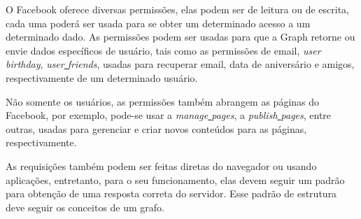 O Facebook oferece diversas permissões, elas podem ser de leitura ou de escrita, cada uma poderá ser usada para se obter um determinado acesso a um determinado dado. As permissões podem ser usadas para que a Graph retorne ou envie dados específicos de usuário, tais como as permissões de email, \textit{user\underline{{ }}birthday}, \textit{user\underline{{ }}friends}, usadas para recuperar email, data de aniversário e amigos, respectivamente de um determinado usuário.

Não somente os usuários, as permissões também abrangem as páginas do Facebook, por exemplo, pode-se usar a \textit{manage\underline{{ }}pages}, a \textit{publish\underline{{ }}pages}, entre outras, usadas para gerenciar e criar novos conteúdos para as páginas, respectivamente.

As requisições também podem ser feitas diretas do navegador ou usando aplicações, entretanto, para o seu funcionamento, elas devem seguir um padrão para obtenção de uma resposta correta do servidor. Esse padrão de estrutura deve seguir os conceitos de um grafo.

